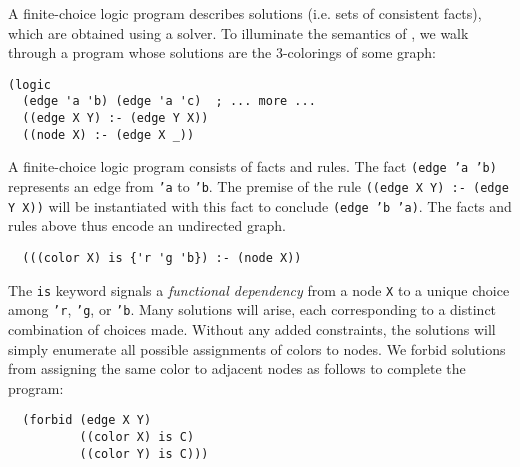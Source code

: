\documentclass[dvipsnames,sigplan,screen,review,anonymous,acmthm,nonacm]{acmart}
\begin{document}
A finite-choice logic program describes solutions
(i.e. sets of consistent facts), which are obtained using a solver.
To illuminate the semantics of \miniDusa{}, we walk through
a program whose solutions are the 3-colorings of some graph:

\begin{verbatim}
(logic
  (edge 'a 'b) (edge 'a 'c)  ; ... more ...
  ((edge X Y) :- (edge Y X))
  ((node X) :- (edge X _))
\end{verbatim}

A finite-choice logic program consists of facts and rules.
The fact \texttt{(edge 'a 'b)} represents an edge from \texttt{'a} to \texttt{'b}.
The premise of the rule \texttt{((edge X Y) :- (edge Y X))} will be
instantiated with this fact to conclude \texttt{(edge 'b 'a)}.
The facts and rules above thus encode an undirected graph.

\begin{verbatim}
  (((color X) is {'r 'g 'b}) :- (node X))
\end{verbatim}

The \texttt{is} keyword signals a \emph{functional dependency}
from a node \texttt{X} to a unique choice among
\texttt{'r}, \texttt{'g}, or \texttt{'b}. Many solutions will arise,
each corresponding to a distinct combination of choices made.
Without any added constraints, the solutions will simply enumerate all
possible assignments of colors to nodes. We forbid solutions from
assigning the same color to adjacent nodes as follows to complete the \miniDusa{} program:

\begin{verbatim}
  (forbid (edge X Y)
          ((color X) is C)
          ((color Y) is C)))
\end{verbatim}
\end{document}
